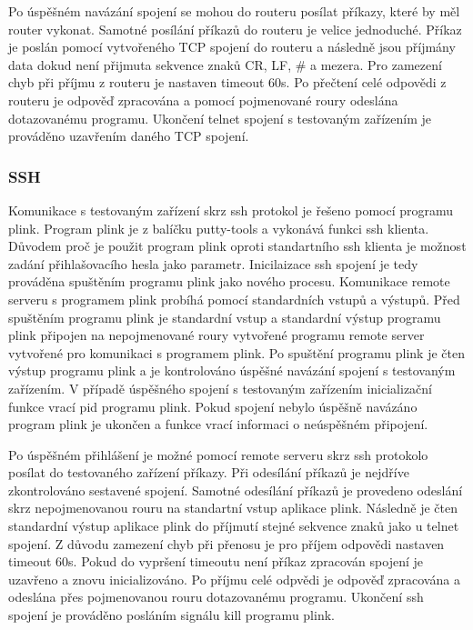 Po úspěšném navázání spojení se mohou do routeru posílat příkazy, které by měl router vykonat. Samotné posílání příkazů do routeru je velice jednoduché. Příkaz je poslán pomocí vytvořeného TCP spojení do routeru a následně jsou příjmány data dokud není přijmuta sekvence znaků CR, LF, \# a mezera. Pro zamezení chyb při příjmu z routeru je nastaven timeout 60s. Po přečtení celé odpovědi z routeru je odpověď zpracována a pomocí pojmenované roury odeslána dotazovanému programu. Ukončení telnet spojení s testovaným zařízením je prováděno uzavřením daného TCP spojení.

\subsubsection{SSH}
Komunikace s testovaným zařízení skrz ssh protokol je řešeno pomocí programu plink. Program plink je z balíčku putty-tools a vykonává funkci ssh klienta. Důvodem proč je použit program plink oproti standartního ssh klienta je možnost zadání přihlašovacího hesla jako parametr. Inicilaizace ssh spojení je tedy prováděna spuštěním programu plink jako nového procesu. Komunikace remote serveru s programem plink probíhá pomocí standardních vstupů a výstupů. Před spuštěním programu plink je standardní vstup a standardní výstup programu plink připojen na nepojmenované roury vytvořené programu remote server vytvořené pro komunikaci s programem plink. Po spuštění programu plink je čten výstup programu plink a je kontrolováno úspěšné navázání spojení s testovaným zařízením. V případě úspěšného spojení s testovaným zařízením inicializační funkce vrací pid programu plink. Pokud spojení nebylo úspěšně navázáno program plink je ukončen a funkce vrací informaci o neúspěšném připojení.

Po úspěšném přihlášení je možné pomocí remote serveru skrz ssh protokolo posílat do testovaného zařízení příkazy. Při odesílání příkazů je nejdříve zkontrolováno sestavené spojení. Samotné odesílání příkazů je provedeno odeslání skrz nepojmenovanou rouru na standartní vstup aplikace plink. Následně je čten standardní výstup aplikace plink do příjmutí stejné sekvence znaků jako u telnet spojení. Z důvodu zamezení chyb při přenosu je pro příjem odpovědi nastaven timeout 60s. Pokud do vypršení timeoutu není příkaz zpracován spojení je uzavřeno a znovu inicializováno. Po příjmu celé odpvědi je odpověď zpracována a odeslána přes pojmenovanou rouru dotazovanému programu. Ukončení ssh spojení je prováděno posláním signálu kill programu plink.

